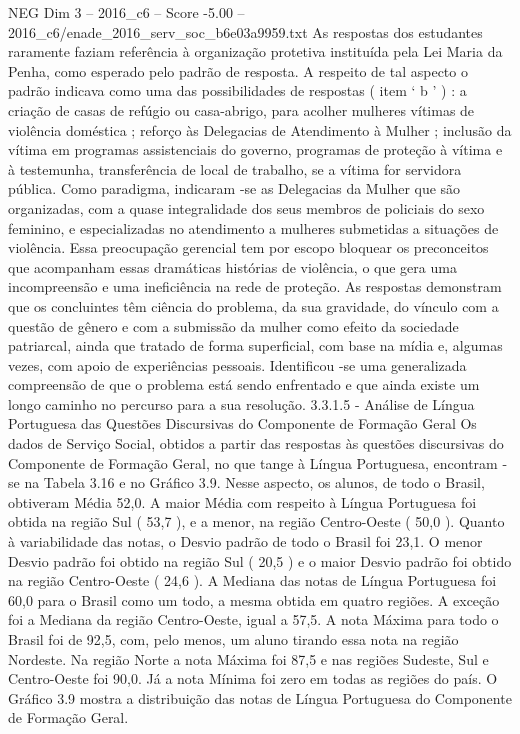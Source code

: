 \begin{textsample}{NEG Dim 3 – 2016\_c6 – Score -5.00 – 2016\_c6/enade\_2016\_serv\_soc\_b6e03a9959.txt}
As respostas dos estudantes raramente faziam referência à organização protetiva instituída pela Lei Maria da Penha, como esperado pelo padrão de resposta.
A respeito de tal aspecto o padrão indicava como uma das possibilidades de respostas ( item ‘ b ’ ) : a criação de casas de refúgio ou casa-abrigo, para acolher mulheres vítimas de violência doméstica ; reforço às Delegacias de Atendimento à Mulher ; inclusão da vítima em programas assistenciais do governo, programas de proteção à vítima e à testemunha, transferência de local de trabalho, se a vítima for servidora pública.
Como paradigma, indicaram -se as Delegacias da Mulher que são organizadas, com a quase integralidade dos seus membros de policiais do sexo feminino, e especializadas no atendimento a mulheres submetidas a situações de violência.
Essa preocupação gerencial tem por escopo bloquear os preconceitos que acompanham essas dramáticas histórias de violência, o que gera uma incompreensão e uma ineficiência na rede de proteção.
As respostas demonstram que os concluintes têm ciência do problema, da sua gravidade, do vínculo com a questão de gênero e com a submissão da mulher como efeito da sociedade patriarcal, ainda que tratado de forma superficial, com base na mídia e, algumas vezes, com apoio de experiências pessoais.
Identificou -se uma generalizada compreensão de que o problema está sendo enfrentado e que ainda existe um longo caminho no percurso para a sua resolução. 3.3.1.5 - Análise de Língua Portuguesa das Questões Discursivas do Componente de Formação Geral Os dados de Serviço Social, obtidos a partir das respostas às questões discursivas do Componente de Formação Geral, no que tange à Língua Portuguesa, encontram -se na Tabela 3.16 e no Gráfico 3.9.
Nesse aspecto, os alunos, de todo o Brasil, obtiveram Média 52,0.
A maior Média com respeito à Língua Portuguesa foi obtida na região Sul ( 53,7 ), e a menor, na região Centro-Oeste ( 50,0 ).
Quanto à variabilidade das notas, o Desvio padrão de todo o Brasil foi 23,1.
O menor Desvio padrão foi obtido na região Sul ( 20,5 ) e o maior Desvio padrão foi obtido na região Centro-Oeste ( 24,6 ).
A Mediana das notas de Língua Portuguesa foi 60,0 para o Brasil como um todo, a mesma obtida em quatro regiões.
A exceção foi a Mediana da região Centro-Oeste, igual a 57,5.
A nota Máxima para todo o Brasil foi de 92,5, com, pelo menos, um aluno tirando essa nota na região Nordeste.
Na região Norte a nota Máxima foi 87,5 e nas regiões Sudeste, Sul e Centro-Oeste foi 90,0.
Já a nota Mínima foi zero em todas as regiões do país.
O Gráfico 3.9 mostra a distribuição das notas de Língua Portuguesa do Componente de Formação Geral.

\end{textsample}
